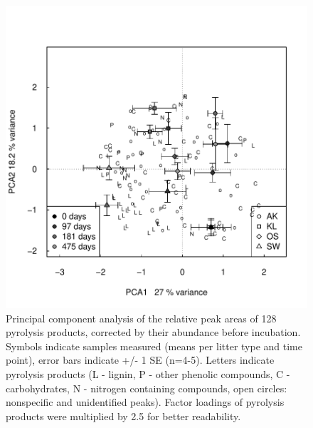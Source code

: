 \documentclass[authoryear,preprint,review,12pt]{elsarticle}
\begin{document}
\newpage
\begin{figure}[h!]
\vspace*{2mm}
\begin{center}
\includegraphics{sbb-pca2}
\end{center}
\caption{Principal component analysis of the relative peak areas of 128 pyrolysis products, corrected by their abundance before incubation. Symbols indicate samples measured (means per litter type and time point), error bars indicate +/- 1 SE (n=4-5). Letters indicate pyrolysis products (L - lignin,  P - other phenolic compounds, C - carbohydrates, N - nitrogen containing compounds, open circles: nonspecific and unidentified peaks). Factor loadings of pyrolysis products were multiplied by 2.5 for better readability.}
\label{fig:pca2}
\end{figure}
\end{document}
